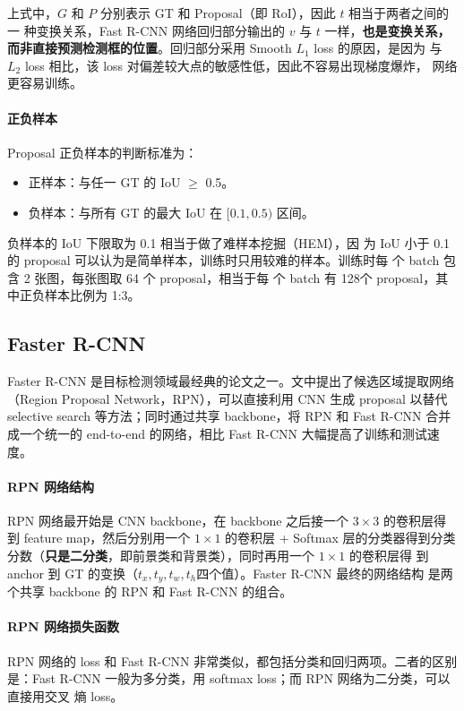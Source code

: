 上式中，$G$ 和 $P$ 分别表示 GT 和 Proposal（即 RoI），因此 $t$ 相当于两者之间的一
种变换关系，Fast R-CNN 网络回归部分输出的 $v$ 与 $t$ 一样，\textbf{也是变换关系，
  而非直接预测检测框的位置}。回归部分采用 Smooth $L_1$ loss 的原因，是因为
与 $L_2$ loss 相比，该 loss 对偏差较大点的敏感性低，因此不容易出现梯度爆炸，
网络更容易训练。

\paragraph{正负样本}
Proposal 正负样本的判断标准为：

\begin{itemize}
  \item 正样本：与任一 GT 的 IoU $ \geq $ 0.5。
  \item 负样本：与所有 GT 的最大 IoU 在 $ [0.1, 0.5) $ 区间。
\end{itemize}

负样本的 IoU 下限取为 0.1 相当于做了难样本挖掘（HEM），因
为 IoU 小于 0.1 的 proposal 可以认为是简单样本，训练时只用较难的样本。训练时每
个 batch 包含 2 张图，每张图取 64 个 proposal，相当于每
个 batch 有 128个 proposal，其中正负样本比例为 1:3。

\subsection{Faster R-CNN}
\label{subsec:Faster-R-CNN}

Faster R-CNN 是目标检测领域最经典的论文之一。文中提出了候选区域提取网络（Region
Proposal Network，RPN），可以直接利用 CNN 生成 proposal 以替代 selective search
等方法；同时通过共享 backbone，将 RPN 和 Fast R-CNN 合并成一个统一的 end-to-end
的网络，相比 Fast R-CNN 大幅提高了训练和测试速度。

\paragraph{RPN 网络结构}
RPN 网络最开始是 CNN backbone，在 backbone 之后接一个 $3 \times 3$ 的卷积层得
到 feature map，然后分别用一个 $1 \times 1$ 的卷积层 + Softmax 层的分类器得到分类
分数（\textbf{只是二分类}，即前景类和背景类），同时再用一个 $1 \times 1$ 的卷积层得
到 anchor 到 GT 的变换（$t_x, t_y, t_w, t_h$四个值）。Faster R-CNN 最终的网络结构
是两个共享 backbone 的 RPN 和 Fast R-CNN 的组合。

\paragraph{RPN 网络损失函数}
RPN 网络的 loss 和 Fast R-CNN 非常类似，都包括分类和回归两项。二者的区别
是：Fast R-CNN 一般为多分类，用 softmax loss；而 RPN 网络为二分类，可以直接用交叉
熵 loss。

